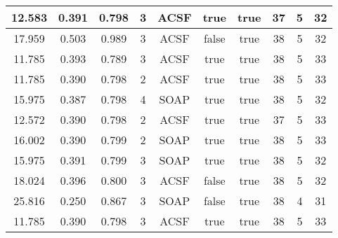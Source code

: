 \documentclass[12pt]{article}
\begin{document}
\begin{table}[H]
\begin{tabular}{|c|c|c|c|c|c|c|c|c|c|}
		12.583	& 0.391	& 0.798	& 3	& ACSF	& true	& true	& 37	& 5	& 32	\\ \hline
		17.959	& 0.503	& 0.989	& 3	& ACSF	& false	& true	& 38	& 5	& 32	\\ \hline
		11.785	& 0.393	& 0.789	& 3	& ACSF	& true	& true	& 38	& 5	& 33	\\ \hline
		11.785	& 0.390	& 0.798	& 2	& ACSF	& true	& true	& 38	& 5	& 33	\\ \hline
		15.975	& 0.387	& 0.798	& 4	& SOAP	& true	& true	& 38	& 5	& 32	\\ \hline
		12.572	& 0.390	& 0.798	& 2	& ACSF	& true	& true	& 37	& 5	& 33	\\ \hline
		16.002	& 0.390	& 0.799	& 2	& SOAP	& true	& true	& 38	& 5	& 33	\\ \hline
		15.975	& 0.391	& 0.799	& 3	& SOAP	& true	& true	& 38	& 5	& 32	\\ \hline
		18.024	& 0.396	& 0.800	& 3	& ACSF	& false	& true	& 38	& 5	& 32	\\ \hline
		25.816	& 0.250	& 0.867	& 3	& SOAP	& false	& true	& 38	& 4	& 31	\\ \hline
		11.785	& 0.390	& 0.798	& 3	& ACSF	& true	& true	& 38	& 5	& 33	\\ \hline
	\end{tabular}
	\label{tab:hyperopt}
\end{table}
\end{document}
